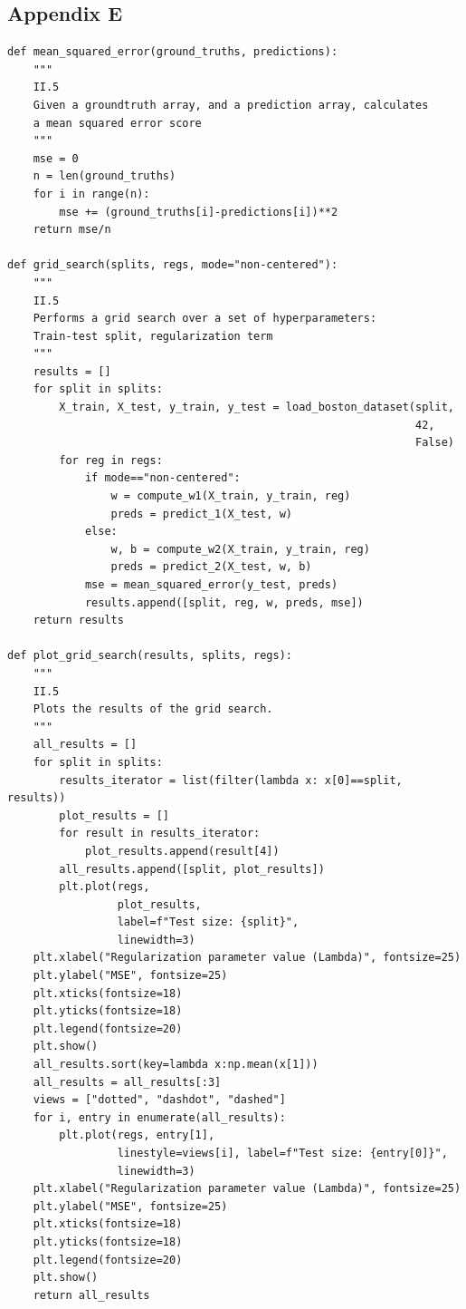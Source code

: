 \documentclass{homework}
\begin{document}
\subsection*{Appendix E}
\lstset{language=Python}
\lstset{frame=lines}
\lstset{basicstyle=\footnotesize}
\begin{lstlisting}
def mean_squared_error(ground_truths, predictions):
    """
    II.5
    Given a groundtruth array, and a prediction array, calculates
    a mean squared error score
    """
    mse = 0
    n = len(ground_truths)
    for i in range(n):
        mse += (ground_truths[i]-predictions[i])**2
    return mse/n

def grid_search(splits, regs, mode="non-centered"):
    """
    II.5 
    Performs a grid search over a set of hyperparameters:
    Train-test split, regularization term
    """
    results = []
    for split in splits:
        X_train, X_test, y_train, y_test = load_boston_dataset(split, 
                                                               42, 
                                                               False)
        for reg in regs:
            if mode=="non-centered":
                w = compute_w1(X_train, y_train, reg)
                preds = predict_1(X_test, w)
            else:
                w, b = compute_w2(X_train, y_train, reg)
                preds = predict_2(X_test, w, b)
            mse = mean_squared_error(y_test, preds)
            results.append([split, reg, w, preds, mse])
    return results

def plot_grid_search(results, splits, regs):
    """
    II.5
    Plots the results of the grid search.
    """
    all_results = []
    for split in splits:
        results_iterator = list(filter(lambda x: x[0]==split, results))
        plot_results = []
        for result in results_iterator:
            plot_results.append(result[4])
        all_results.append([split, plot_results])
        plt.plot(regs, 
                 plot_results, 
                 label=f"Test size: {split}", 
                 linewidth=3)
    plt.xlabel("Regularization parameter value (Lambda)", fontsize=25)
    plt.ylabel("MSE", fontsize=25)
    plt.xticks(fontsize=18)
    plt.yticks(fontsize=18)
    plt.legend(fontsize=20)
    plt.show()
    all_results.sort(key=lambda x:np.mean(x[1]))
    all_results = all_results[:3]
    views = ["dotted", "dashdot", "dashed"]
    for i, entry in enumerate(all_results):
        plt.plot(regs, entry[1], 
                 linestyle=views[i], label=f"Test size: {entry[0]}", 
                 linewidth=3)
    plt.xlabel("Regularization parameter value (Lambda)", fontsize=25)
    plt.ylabel("MSE", fontsize=25)
    plt.xticks(fontsize=18)
    plt.yticks(fontsize=18)
    plt.legend(fontsize=20)
    plt.show()
    return all_results
\end{lstlisting}
\end{document}
